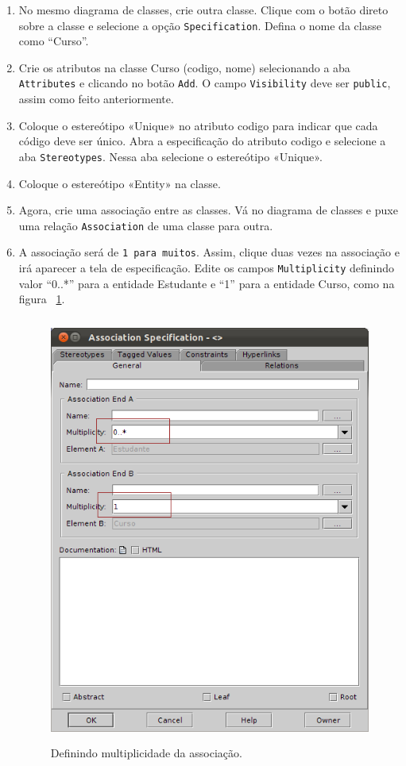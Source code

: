 \begin{enumerate}
\item No mesmo diagrama de classes, crie outra classe. Clique com o botão direto
sobre a classe e selecione a opção \texttt{Specification}. Defina o nome da classe como
“Curso”.
	
\item Crie os atributos na classe Curso (codigo, nome) selecionando a aba
\texttt{Attributes} e clicando no botão \texttt{Add}. O campo \texttt{Visibility} deve ser \texttt{public}, assim
como feito anteriormente.

\item Coloque o estereótipo «Unique» no atributo codigo para indicar que cada
código deve ser único. Abra a especificação do atributo codigo e selecione a aba
\texttt{Stereotypes}. Nessa aba selecione o estereótipo «Unique».
	
\item Coloque o estereótipo «Entity» na classe.
	
\item Agora, crie uma associação entre as classes. Vá no diagrama de classes e
puxe uma relação \texttt{Association} de uma classe para outra.
	
\item A associação será de \texttt{1 para muitos}. Assim, clique duas vezes na associação
e irá aparecer a tela de especificação. Edite os campos \texttt{Multiplicity} definindo
valor “0..*” para a entidade Estudante e “1” para a entidade Curso, como na
figura ~\ref{define_multiplicidade_associacao}.
\begin{figure}[!htb]
	\centering
	\includegraphics[width=350pt,height=400pt]{imgs/tutorial-mdarte-0005.png}
	\caption{Definindo multiplicidade da associação.}
	\label{define_multiplicidade_associacao}
\end{figure}
	

\end{enumerate}
